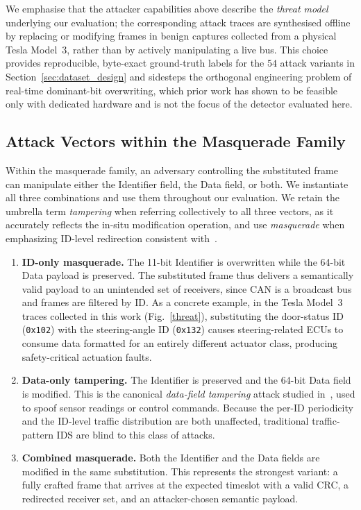 \documentclass[lettersize,journal]{IEEEtran}
\begin{document}
We emphasise that the attacker capabilities above describe the
\emph{threat model} underlying our evaluation; the corresponding
attack traces are synthesised offline by replacing or modifying
frames in benign captures collected from a physical Tesla Model~3,
rather than by actively manipulating a live bus. This choice
provides reproducible, byte-exact ground-truth labels for the
$54$ attack variants in Section~\ref{sec:dataset_design} and
sidesteps the orthogonal engineering problem of real-time
dominant-bit overwriting, which prior work has shown to be
feasible only with dedicated hardware and is not the focus of
the detector evaluated here.

\subsection{Attack Vectors within the Masquerade Family}
\label{subsec:taxonomy}

Within the masquerade family, an adversary controlling the substituted frame can manipulate either the Identifier field, the Data field, or both. We instantiate all three combinations and use them throughout our evaluation. We retain the umbrella term \emph{tampering} when referring collectively to all three vectors, as it accurately reflects the in-situ modification operation, and use \emph{masquerade} when emphasizing ID-level redirection consistent with~\cite{b37}.
\begin{enumerate}
\item \textbf{ID-only masquerade.} The 11-bit Identifier is overwritten while the 64-bit Data payload is preserved. The substituted frame thus delivers a semantically valid payload to an unintended set of receivers, since CAN is a broadcast bus and frames are filtered by ID. As a concrete example, in the Tesla Model~3 traces collected in this work (Fig.~\ref{threat}), substituting the door-status ID (\texttt{0x102}) with the steering-angle ID (\texttt{0x132}) causes steering-related ECUs to consume data formatted for an entirely different actuator class, producing safety-critical actuation faults.
\item \textbf{Data-only tampering.} The Identifier is preserved and the 64-bit Data field is modified. This is the canonical \emph{data-field tampering} attack studied in~\cite{b51,b52}, used to spoof sensor readings or control commands. Because the per-ID periodicity and the ID-level traffic distribution are both unaffected, traditional traffic-pattern IDS are blind to this class of attacks.
\item \textbf{Combined masquerade.} Both the Identifier and the Data fields are modified in the same substitution. This represents the strongest variant: a fully crafted frame that arrives at the expected timeslot with a valid CRC, a redirected receiver set, and an attacker-chosen semantic payload.
\end{enumerate}
\end{document}
